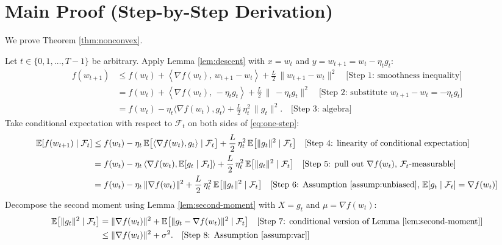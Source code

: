 \documentclass[11pt]{article}
\begin{document}
\section*{Main Proof (Step-by-Step Derivation)}
We prove Theorem \ref{thm:nonconvex}.

Let $t\in\{0,1,\dots,T-1\}$ be arbitrary. Apply Lemma \ref{lem:descent} with $x=w_t$ and $y=w_{t+1}=w_t-\eta_t g_t$:
\begin{align}
f(w_{t+1})
&\le f(w_t) + \left\langle \nabla f(w_t),\, w_{t+1}-w_t \right\rangle + \frac{L}{2}\,\|w_{t+1}-w_t\|^2 \quad \text{[Step 1: smoothness inequality]} \nonumber\\
&= f(w_t) + \left\langle \nabla f(w_t),\, -\eta_t g_t \right\rangle + \frac{L}{2}\,\|\,-\eta_t g_t\|^2 \quad \text{[Step 2: substitute $w_{t+1}-w_t=-\eta_t g_t$]} \nonumber\\
&= f(w_t) - \eta_t \langle \nabla f(w_t), g_t \rangle + \frac{L}{2}\,\eta_t^2\,\|g_t\|^2. \quad \text{[Step 3: algebra]} \label{eq:one-step}
\end{align}
Take conditional expectation with respect to $\mathcal{F}_t$ on both sides of \eqref{eq:one-step}:
\begin{align}
\mathbb{E}[f(w_{t+1}) \mid \mathcal{F}_t]
&\le f(w_t) - \eta_t \,\mathbb{E}\big[\langle \nabla f(w_t), g_t \rangle \mid \mathcal{F}_t\big]
+ \frac{L}{2}\,\eta_t^2\, \mathbb{E}\big[\|g_t\|^2 \mid \mathcal{F}_t\big] \quad \text{[Step 4: linearity of conditional expectation]} \nonumber\\
&= f(w_t) - \eta_t \,\langle \nabla f(w_t), \mathbb{E}[g_t \mid \mathcal{F}_t]\rangle
+ \frac{L}{2}\,\eta_t^2\, \mathbb{E}\big[\|g_t\|^2 \mid \mathcal{F}_t\big] \quad \text{[Step 5: pull out $\nabla f(w_t)$, $\mathcal{F}_t$-measurable]} \nonumber\\
&= f(w_t) - \eta_t \,\|\nabla f(w_t)\|^2
+ \frac{L}{2}\,\eta_t^2\, \mathbb{E}\big[\|g_t\|^2 \mid \mathcal{F}_t\big] \quad \text{[Step 6: Assumption \ref{assump:unbiased}, $\mathbb{E}[g_t\mid \mathcal{F}_t]=\nabla f(w_t)$]} \label{eq:cond-exp-1}
\end{align}
Decompose the second moment using Lemma \ref{lem:second-moment} with $X=g_t$ and $\mu=\nabla f(w_t)$:
\begin{align}
\mathbb{E}\big[\|g_t\|^2 \mid \mathcal{F}_t\big]
&= \|\nabla f(w_t)\|^2 + \mathbb{E}\big[\|g_t - \nabla f(w_t)\|^2 \mid \mathcal{F}_t\big] \quad \text{[Step 7: conditional version of Lemma \ref{lem:second-moment}]} \nonumber\\
&\le \|\nabla f(w_t)\|^2 + \sigma^2. \quad \text{[Step 8: Assumption \ref{assump:var}]} \label{eq:var-bound}
\end{align}
\end{document}
